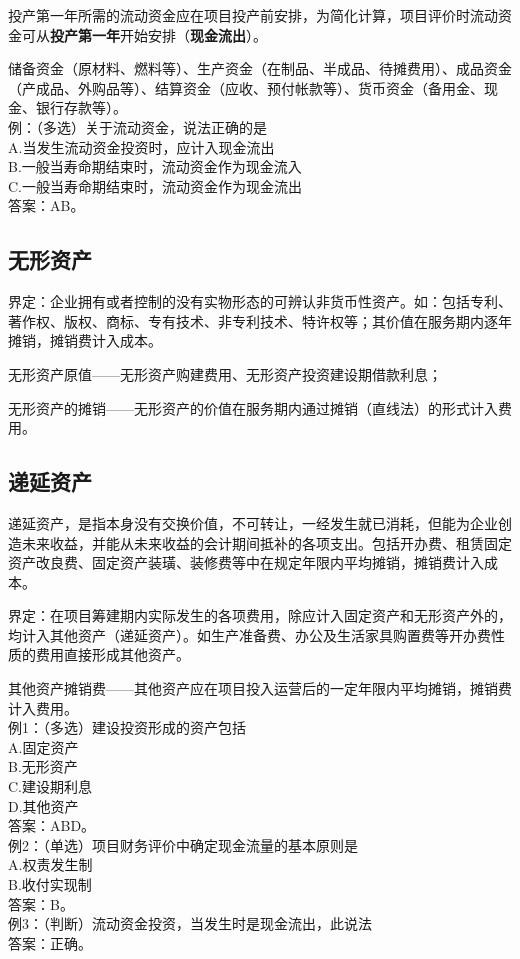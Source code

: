 投产第一年所需的流动资金应在项目投产前安排，为简化计算，项目评价时流动资金可从\textbf{投产第一年}开始安排（\textbf{现金流出}）。

储备资金（原材料、燃料等）、生产资金（在制品、半成品、待摊费用）、成品资金（产成品、外购品等）、结算资金（应收、预付帐款等）、货币资金（备用金、现金、银行存款等）。\\
例：（多选）关于流动资金，说法正确的是\\
A.当发生流动资金投资时，应计入现金流出\\
B.一般当寿命期结束时，流动资金作为现金流入\\
C.一般当寿命期结束时，流动资金作为现金流出\\
答案：AB。

\subsection{无形资产}
界定：企业拥有或者控制的没有实物形态的可辨认非货币性资产。如：包括专利、著作权、版权、商标、专有技术、非专利技术、特许权等；其价值在服务期内逐年摊销，摊销费计入成本。

无形资产原值——无形资产购建费用、无形资产投资建设期借款利息；

无形资产的摊销——无形资产的价值在服务期内通过摊销（直线法）的形式计入费用。

\subsection{递延资产}
递延资产，是指本身没有交换价值，不可转让，一经发生就已消耗，但能为企业创造未来收益，并能从未来收益的会计期间抵补的各项支出。包括开办费、租赁固定资产改良费、固定资产装璜、装修费等中在规定年限内平均摊销，摊销费计入成本。

界定：在项目筹建期内实际发生的各项费用，除应计入固定资产和无形资产外的，均计入其他资产（递延资产）。如生产准备费、办公及生活家具购置费等开办费性质的费用直接形成其他资产。

其他资产摊销费——其他资产应在项目投入运营后的一定年限内平均摊销，摊销费计入费用。\\
例1：（多选）建设投资形成的资产包括\\
A.固定资产\\
B.无形资产\\
C.建设期利息\\
D.其他资产\\
答案：ABD。\\
例2：（单选）项目财务评价中确定现金流量的基本原则是\\
A.权责发生制\\
B.收付实现制\\
答案：B。\\
例3：（判断）流动资金投资，当发生时是现金流出，此说法\\
答案：正确。


